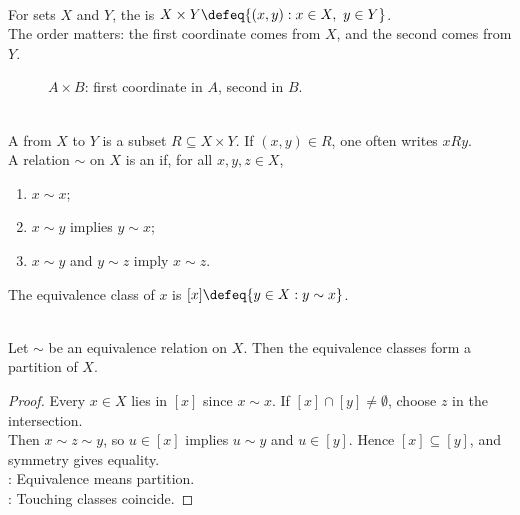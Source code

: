 \begin{definition} \label{def:cartesian-product} \\
For sets $X$ and $Y$, the  is $X\times Y\defeq\{(x,y):x\in X,\ y\in Y\}$.\\
The order matters: the first coordinate comes from $X$, and the second comes from $Y$.
\end{definition}

\begin{figure}[H]
    \centering
    
    \caption{$A\times B$: first coordinate in $A$, second in $B$.}
    \label{fig:cartesian-product-rectangle}
\end{figure}

\begin{definition} \label{def:relations-and-equivalence} \\
A  from $X$ to $Y$ is a subset $R\subseteq X\times Y$. If $(x,y)\in R$, one often writes $xRy$.\\
A relation $\sim$ on $X$ is an  if, for all $x,y,z\in X$,
\begin{enumerate}[label=\roman*.]
\setlength{\itemsep}{0pt}
\item $x\sim x$;
\item $x\sim y$ implies $y\sim x$;
\item $x\sim y$ and $y\sim z$ imply $x\sim z$.
\end{enumerate}
The equivalence class of $x$ is $[x]\defeq\{y\in X:y\sim x\}$.
\end{definition}

\begin{proposition} \label{prop:equivalence-relations-partitions} \\
Let $\sim$ be an equivalence relation on $X$. Then the equivalence classes form a partition of $X$.
\begin{proof}
Every $x\in X$ lies in $[x]$ since $x\sim x$. If $[x]\cap[y]\neq\emptyset$, choose $z$ in the intersection.\\
Then $x\sim z\sim y$, so $u\in[x]$ implies $u\sim y$ and $u\in[y]$. Hence $[x]\subseteq[y]$, and symmetry gives equality.\\
: Equivalence means partition.\\
: Touching classes coincide.
\end{proof}
\end{proposition}

